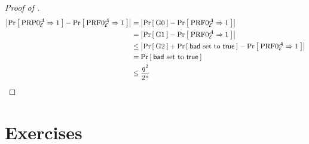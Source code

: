 \begin{proof}[Proof of ]
	 \begin{align*}
	 \left| \Prob{\PRP0_\cipher^\advA\Rightarrow 1} 
	 - \Prob{\PRF0_\cipher^\advA\Rightarrow1} \right|  
	 &=  \left|\Prob{\G0} - \Prob{\PRF0_\cipher^\advA\Rightarrow1} \right|  \\
	 &=  \left|\Prob{\G1} - \Prob{\PRF0_\cipher^\advA\Rightarrow1} \right|  \\
	 &\le \left|\Prob{\G2} + \Prob{\bad \text{ set to } \true} - \Prob{\PRF0_\cipher^\advA\Rightarrow1} \right|\\
	 &= \Prob{\bad \text{ set to } \true}\\
	 &\le \frac{q^2}{2^n} \\
	 \end{align*} 
\end{proof}


\section*{Exercises}

